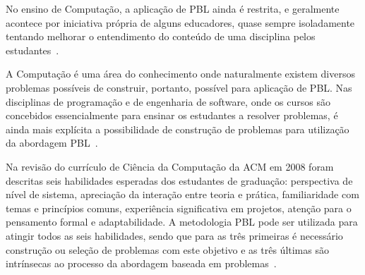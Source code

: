 No ensino de Computação, a aplicação de PBL ainda é restrita, e geralmente
acontece por iniciativa própria de alguns educadores,
quase sempre isoladamente tentando melhorar o
entendimento do conteúdo de uma disciplina
pelos estudantes~\cite{wood2003problem, o2012practical}.

A Computação é uma área do conhecimento onde naturalmente existem
diversos problemas possíveis de construir, portanto, possível para
aplicação de PBL.
Nas disciplinas de programação e de engenharia de software, onde os
cursos são concebidos essencialmente para ensinar os estudantes
a resolver problemas, é ainda mais explícita a possibilidade
de construção de problemas para utilização da abordagem
PBL~\cite{fee2010teaching}.

Na revisão do currículo de Ciência da Computação da ACM em 2008
foram descritas seis habilidades esperadas dos estudantes
de graduação: perspectiva de nível de sistema,
apreciação da interação entre teoria e prática,
familiaridade com temas e princípios comuns,
experiência significativa em projetos,
atenção para o pensamento formal e
adaptabilidade.
A metodologia PBL pode ser utilizada para atingir
todos as seis habilidades, sendo que para as três primeiras
é necessário construção ou seleção de problemas com este objetivo e 
as três últimas são intrínsecas ao processo da abordagem baseada
em problemas~\cite{cassel2008computer}.
